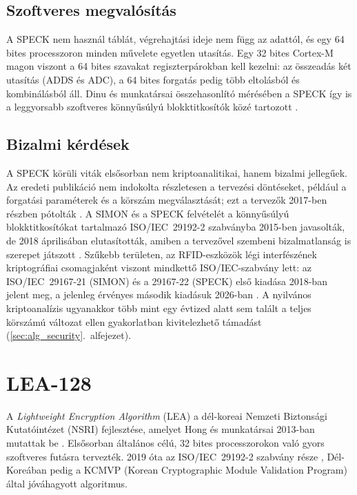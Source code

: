 \documentclass[a4paper,12pt]{report}
\theoremstyle{definition}
\theoremstyle{remark}
\begin{document}
\subsection{Szoftveres megvalósítás}

A SPECK nem használ táblát, végrehajtási ideje nem függ az adattól, és egy 64 bites processzoron minden művelete egyetlen utasítás. Egy 32 bites Cortex-M magon viszont a 64 bites szavakat regiszterpárokban kell kezelni: az összeadás két utasítás (ADDS és ADC), a 64 bites forgatás pedig több eltolásból és kombinálásból áll. Dinu és munkatársai összehasonlító mérésében a SPECK így is a leggyorsabb szoftveres könnyűsúlyú blokktitkosítók közé tartozott \cite{Dinu2015}.

\subsection{Bizalmi kérdések}

A SPECK körüli viták elsősorban nem kriptoanalitikai, hanem bizalmi jellegűek. Az eredeti publikáció nem indokolta részletesen a tervezési döntéseket, például a forgatási paraméterek és a körszám megválasztását; ezt a tervezők 2017-ben részben pótolták \cite{Beaulieu2017}. A SIMON és a SPECK felvételét a könnyűsúlyú blokktitkosítókat tartalmazó ISO/IEC~29192-2 szabványba 2015-ben javasolták, de 2018 áprilisában elutasították, amiben a tervezővel szembeni bizalmatlanság is szerepet játszott \cite{Ashur2021}. Szűkebb területen, az RFID-eszközök légi interfészének kriptográfiai csomagjaként viszont mindkettő ISO/IEC-szabvány lett: az ISO/IEC~29167-21 (SIMON) és a 29167-22 (SPECK) első kiadása 2018-ban jelent meg, a jelenleg érvényes második kiadásuk 2026-ban \cite{ISO29167SIMON,ISO29167}. A nyilvános kriptoanalízis ugyanakkor több mint egy évtized alatt sem talált a teljes körszámú változat ellen gyakorlatban kivitelezhető támadást (\ref{sec:alg_security}.~alfejezet).

\section{LEA-128}\label{sec:lea}

A \emph{Lightweight Encryption Algorithm} (LEA) a dél-koreai Nemzeti Biztonsági Kutatóintézet (NSRI) fejlesztése, amelyet Hong és munkatársai 2013-ban mutattak be \cite{Hong2013}. Elsősorban általános célú, 32 bites processzorokon való gyors szoftveres futásra tervezték. 2019 óta az ISO/IEC~29192-2 szabvány része \cite{ISO29192}, Dél-Koreában pedig a KCMVP (Korean Cryptographic Module Validation Program) által jóváhagyott algoritmus.
\end{document}
